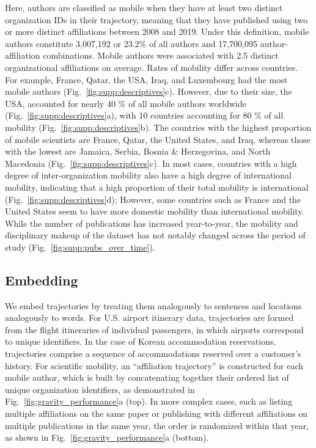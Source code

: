 \documentclass[12pt]{article} %
\begin{document}
Here, authors are classified as mobile when they have at least two distinct organization IDs in their trajectory, meaning that they have published using two or more distinct affiliations between 2008 and 2019.
Under this definition, mobile authors constitute 3,007,192 or 23.2\% of all authors and 17,700,095 author-affiliation combinations.
Mobile authors were associated with 2.5 distinct organizational affiliations on average.
Rates of mobility differ across countries.
For example, France, Qatar, the USA, Iraq, and Luxembourg had the most mobile authors (Fig.~\ref{fig:supp:descriptives}c).
However, due to their size, the USA, accounted for nearly 40 \% of all mobile authors worldwide (Fig.~\ref{fig:supp:descriptives}a), with 10 countries accounting for 80 \% of all mobility (Fig.~\ref{fig:supp:descriptives}b).
The countries with the highest proportion of mobile scientists are France, Qatar, the United States, and Iraq, whereas those with the lowest are Jamaica, Serbia, Bosnia \& Herzegovina, and North Macedonia (Fig.~\ref{fig:supp:descriptives}c).
In most cases, countries with a high degree of inter-organization mobility also have a high degree of international mobility, indicating that a high proportion of their total mobility is international (Fig.~\ref{fig:supp:descriptives}d);
However, some countries such as France and the United States seem to have more domestic mobility than international mobility.
While the number of publications has increased year-to-year, the mobility and disciplinary makeup of the dataset has not notably changed across the period of study (Fig.~\ref{fig:supp:pubs_over_time}).


\subsection*{Embedding}

We embed trajectories by treating them analogously to sentences and locations analogously to words.
For U.S. airport itinerary data, trajectories are formed from the flight itineraries of individual passengers, in which airports correspond to unique identifiers.
In the case of Korean accommodation reservations, trajectories comprise a sequence of accommodations reserved over a customer's history.
For scientific mobility, an ``affiliation trajectory'' is constructed for each mobile author, which is built by concatenating together their ordered list of unique organization identifiers, as demonstrated in Fig.~\ref{fig:gravity_performance}a (top).
In more complex cases, such as listing multiple affiliations on the same paper or publishing with different affiliations on multiple publications in the same year, the order is randomized within that year, as shown in Fig.~\ref{fig:gravity_performance}a (bottom).
\end{document}
